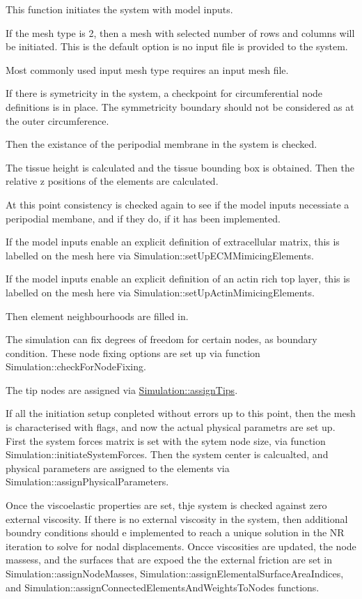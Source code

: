 This function initiates the system with model inputs. 

If the mesh type is 2, then a mesh with selected number of rows and columns will be initiated. This is the default option is no input file is provided to the system.

Most commonly used input mesh type requires an input mesh file.

If there is symetricity in the system, a checkpoint for circumferential node definitions is in place. The symmetricity boundary should not be considered as at the outer circumference.

Then the existance of the peripodial membrane in the system is checked.

The tissue height is calculated and the tissue bounding box is obtained. Then the relative z positions of the elements are calculated.

At this point consistency is checked again to see if the model inputs necessiate a peripodial membane, and if they do, if it has been implemented.

If the model inputs enable an explicit definition of extracellular matrix, this is labelled on the mesh here via Simulation\+::set\+Up\+E\+C\+M\+Mimicing\+Elements.

If the model inputs enable an explicit definition of an actin rich top layer, this is labelled on the mesh here via Simulation\+::set\+Up\+Actin\+Mimicing\+Elements.

Then element neighbourhoods are filled in.

The simulation can fix degrees of freedom for certain nodes, as boundary condition. These node fixing options are set up via function Simulation\+::check\+For\+Node\+Fixing.

The tip nodes are assigned via \hyperlink{classSimulation_a7ed75e3d044166072754e6e323f3604c}{Simulation\+::assign\+Tips}.

If all the initiation setup conpleted without errors up to this point, then the mesh is characterised with flags, and now the actual physical parametrs are set up. First the system forces matrix is set with the sytem node size, via function Simulation\+::initiate\+System\+Forces. Then the system center is calcualted, and physical parameters are assigned to the elements via Simulation\+::assign\+Physical\+Parameters. ~\newline


Once the viscoelastic properties are set, thje system is checked against zero external viscosity. If there is no external viscosity in the system, then additional boundry conditions should e implemented to reach a unique solution in the N\+R iteration to solve for nodal displacements. Oncce viscosities are updated, the node massess, and the surfaces that are expoed the the external friction are set in Simulation\+::assign\+Node\+Masses, Simulation\+::assign\+Elemental\+Surface\+Area\+Indices, and Simulation\+::assign\+Connected\+Elements\+And\+Weights\+To\+Nodes functions.

